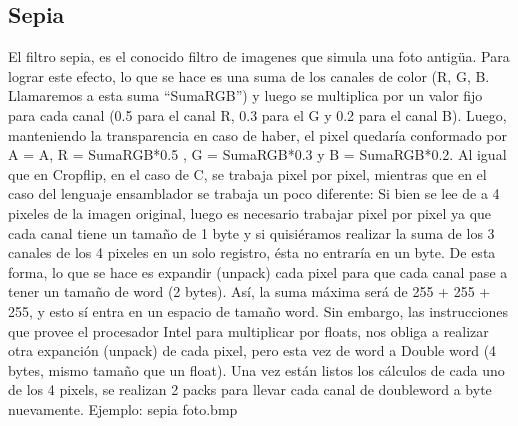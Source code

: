 \documentclass[a4paper]{article}
\begin{document}
\subsection{Sepia}
El filtro sepia, es el conocido filtro de imagenes que simula una foto antigüa. Para lograr este efecto, lo que se hace es una suma
de los canales de color (R, G, B. Llamaremos a esta suma ``SumaRGB'') y luego se multiplica por un valor fijo para cada canal (0.5 para el canal R, 0.3 para el G
y 0.2 para el canal B). Luego, manteniendo la transparencia en caso de haber, el pixel quedaría conformado por A = A, R = SumaRGB*0.5
, G = SumaRGB*0.3 y B = SumaRGB*0.2. \newline
Al igual que en Cropflip, en el caso de C, se trabaja pixel por pixel, mientras que en el caso del lenguaje ensamblador se trabaja un poco diferente:
Si bien se lee de a 4 pixeles de la imagen original, luego es necesario trabajar pixel por pixel ya que cada canal tiene un tamaño de 1 byte
y si quisiéramos realizar la suma de los 3 canales de los 4 pixeles en un solo registro, ésta no entraría en un byte. De esta forma, lo que se hace
es expandir (unpack) cada pixel para que cada canal pase a tener un tamaño de word (2 bytes). Así, la suma máxima será de 255 + 255 + 255, y esto sí
entra en un espacio de tamaño word. Sin embargo, las instrucciones que provee el procesador Intel para multiplicar por floats, nos obliga
a realizar otra expanción (unpack) de cada pixel, pero esta vez de word a Double word (4 bytes, mismo tamaño que un float).
Una vez están listos los cálculos de cada uno de los 4 pixels, se realizan 2 packs para llevar cada canal de doubleword a byte nuevamente.
\newline
Ejemplo: sepia foto.bmp
\end{document}
